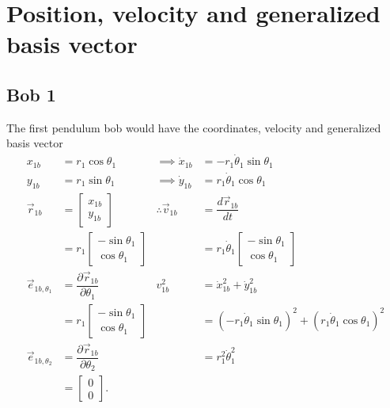 \documentclass[12pt,a4paper,portrait]{article}
\begin{document}
	
	\section{Position, velocity and generalized basis vector}
	\subsection{Bob 1}
	The first pendulum bob would have the coordinates, velocity and generalized basis vector
	\begin{align*}
		x_{1b} &= r_1 \cos{\theta_1} &\implies \dot{x}_{1b} &= -r_1\dot{\theta}_1 \sin{\theta_1}\\
		y_{1b} &= r_1 \sin{\theta_1} &\implies \dot{y}_{1b} &= r_1 \dot{\theta}_1 \cos{\theta_1} \\
		\vec{r}_{1b} &= \begin{bmatrix}
			x_{1b}\\
			y_{1b}
		\end{bmatrix}  &\therefore \vec{v}_{1b} &= \dfrac{d \vec{r}_{1b}}{dt}\\
		&= r_1\begin{bmatrix}
				-\sin{\theta_1} \\
				\cos{\theta_1}
			\end{bmatrix} & &=r_1\dot{\theta}_1 \begin{bmatrix}
			-\sin{\theta_1} \\
			\cos{\theta_1}
		\end{bmatrix} \\
		\vec{e}_{1b,\theta_1} &= \dfrac{\partial \vec{r}_{1b}}{\partial \theta_1}& v_{1b}^2 &= \dot{x}_{1b}^2 + \dot{y}_{1b}^2 \\
		&= r_1 \begin{bmatrix}
			-\sin{\theta_1}\\
			\cos{\theta_1}
		\end{bmatrix} & &= \left(-r_1\dot{\theta}_1 \sin{\theta_1}\right)^2 + \left(r_1 \dot{\theta}_1 \cos{\theta_1}\right)^2 \\
		\vec{e}_{1b,\theta_2} &= \dfrac{\partial \vec{r}_{1b}}{\partial \theta_2} &&= r_1^2 \dot{\theta}_1^2\\
		&= \begin{bmatrix}
			0\\
			0
		\end{bmatrix}.
	\end{align*}
	
\end{document}
